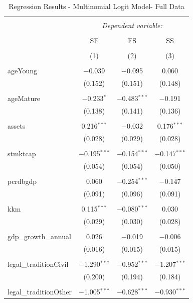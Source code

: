 \documentclass[a4paper, nobind]{templates/ociamthesis}
\begin{document}
\begin{table}[!htbp] \centering 
  \caption{Regression Results - Multinomial Logit Model- Full Data} 
  \label{} 
\footnotesize 
\begin{tabular}{@{\extracolsep{5pt}}lccc} 
\\[-1.8ex]\hline 
\hline \\[-1.8ex] 
 & \multicolumn{3}{c}{\textit{Dependent variable:}} \\ 
\cline{2-4} 
\\[-1.8ex] & SF & FS & SS \\ 
\\[-1.8ex] & (1) & (2) & (3)\\ 
\hline \\[-1.8ex] 
 ageYoung & $-$0.039 & $-$0.095 & 0.060 \\ 
  & (0.152) & (0.151) & (0.148) \\ 
  & & & \\ 
 ageMature & $-$0.233$^{*}$ & $-$0.483$^{***}$ & $-$0.191 \\ 
  & (0.138) & (0.141) & (0.136) \\ 
  & & & \\ 
 assets & 0.216$^{***}$ & $-$0.032 & 0.176$^{***}$ \\ 
  & (0.028) & (0.029) & (0.028) \\ 
  & & & \\ 
 stmktcap & $-$0.195$^{***}$ & $-$0.154$^{***}$ & $-$0.147$^{***}$ \\ 
  & (0.054) & (0.054) & (0.050) \\ 
  & & & \\ 
 pcrdbgdp & 0.060 & $-$0.254$^{***}$ & $-$0.147 \\ 
  & (0.091) & (0.096) & (0.091) \\ 
  & & & \\ 
 kkm & 0.115$^{***}$ & $-$0.080$^{***}$ & 0.030 \\ 
  & (0.029) & (0.030) & (0.028) \\ 
  & & & \\ 
 gdp\_growth\_annual & 0.026 & $-$0.019 & $-$0.006 \\ 
  & (0.016) & (0.015) & (0.015) \\ 
  & & & \\ 
 legal\_traditionCivil & $-$1.290$^{***}$ & $-$0.952$^{***}$ & $-$1.207$^{***}$ \\ 
  & (0.200) & (0.194) & (0.184) \\ 
  & & & \\ 
 legal\_traditionOther & $-$1.005$^{***}$ & $-$0.628$^{***}$ & $-$0.930$^{***}$ \\ 

\end{tabular}
\end{table}
\end{document}
